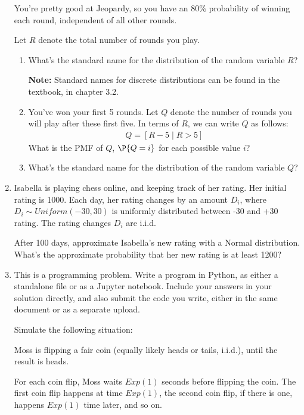 \documentclass{article}
\begin{document}
\begin{enumerate}
You're pretty good at Jeopardy, so you have an $80\%$ probability of winning each round, independent of all other rounds.

Let $R$ denote the total number of rounds you play.

\begin{enumerate}
    \item What's the standard name for the distribution of the random variable $R$?

    \textbf{Note:} Standard names for discrete distributions can be found in the textbook, in chapter 3.2.
    \item You've won your first 5 rounds. Let $Q$ denote the number of rounds you will play after these first five. In terms of $R$, we can write $Q$ as follows:
    \begin{align*}
        Q = [R-5 \mid R > 5]
    \end{align*}
    What is the PMF of $Q$, $\P{Q = i}$ for each possible value $i$?
    
    \item What's the standard name for the distribution of the random variable $Q$?
\end{enumerate}

\item Isabella is playing chess online, and keeping track of her rating.
Her initial rating is 1000. Each day, her rating changes by an amount $D_i$, where $D_i \sim Uniform(-30, 30)$ is uniformly distributed between -30 and +30 rating. The rating changes $D_i$ are i.i.d.

After 100 days, approximate Isabella's new rating with a Normal distribution. What's the approximate probability that her new rating is at least 1200?

\item This is a programming problem. Write a program in Python, as either a standalone file or as a Jupyter notebook.
    Include your answers in your solution directly, and also submit the code you write, either in the same document or as a separate upload.

    Simulate the following situation:
    
    Moss is flipping a fair coin (equally likely heads or tails, i.i.d.), until the result is heads.
    
    For each coin flip, Moss waits $Exp(1)$ seconds before flipping the coin. The first coin flip happens at time $Exp(1)$,
    the second coin flip, if there is one, happens $Exp(1)$ time later, and so on.


\end{enumerate}
\end{document}
